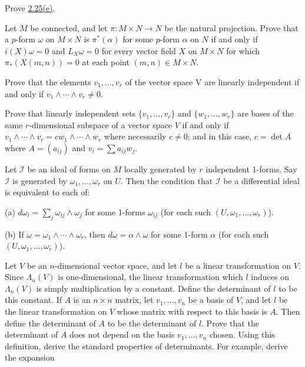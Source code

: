 \begin{problemset}
\item Prove \hyperref[thm:2.25]{2.25(e)}.

\item Let $M$ be connected, and let $\pi: M \times N \to N$ be the natural projection. Prove that a $p$-form $\omega$ on $M \times N$ is $\pi^{*}(\alpha)$ for some $p$-form $\alpha$ on $N$ if and only if $i(X)\omega = 0$ and $L_{X}\omega = 0$ for every vector field $X$ on $M \times N$ for which $\pi_{*}(X(m,n)) = 0$ at each point $(m,n) \in M \times N$.

\item Prove that the elements  $ v_{1}, \ldots, v_{r} $ of the vector space V are linearly independent if and only if  $ v_{1} \wedge \cdots \wedge v_{r} \neq 0 $.

\item Prove that linearly independent sets $\{v_1, \ldots, v_r\}$ and $\{w_1, \ldots, w_r\}$ are bases of the same $r$-dimensional subspace of a vector space $V$ if and only if $v_1 \wedge \cdots \wedge v_r = cw_1 \wedge \cdots \wedge w_r$ where necessarily $c \neq 0$; and in this case, $c = \det A$ where $A = (a_{ij})$ and $v_i = \sum a_{ij}w_j$.

\item Let $\mathcal{I}$ be an ideal of forms on $M$ locally generated by $r$ independent 1-forms. Say $\mathcal{I}$ is generated by $\omega_{1},\ldots,\omega_{r}$ on $U$. Then the condition that $\mathcal{I}$ be a differential ideal is equivalent to each of:

(a)  $ d\omega_i = \sum_j \omega_{ij} \wedge \omega_j $ for some 1-forms  $ \omega_{ij} $ (for each such  $ (U, \omega_1, \ldots, \omega_r) $).

(b) If  $ \omega = \omega_1 \wedge \cdots \wedge \omega_r $, then  $ d\omega = \alpha \wedge \omega $ for some 1-form  $ \alpha $ (for each such  $ (U, \omega_1, \ldots, \omega_r) $).

\item Let $V$ be an $n$-dimensional vector space, and let $l$ be a linear transformation on $V$. Since $\Lambda_n(V)$ is one-dimensional, the linear transformation which $l$ induces on $\Lambda_n(V)$ is simply multiplication by a constant. Define the determinant of $l$ to be this constant. If $A$ is an $n \times n$ matrix, let $v_1, \ldots, v_n$ be a basis of $V$, and let $l$ be the linear transformation on $V$ whose matrix with respect to this basis is $A$. Then define the determinant of $A$ to be the determinant of $l$. Prove that the determinant of $A$ does not depend on the basis $v_1, \ldots, v_n$ chosen. Using this definition, derive the standard properties of determinants. For example, derive the expansion


\end{problemset}
